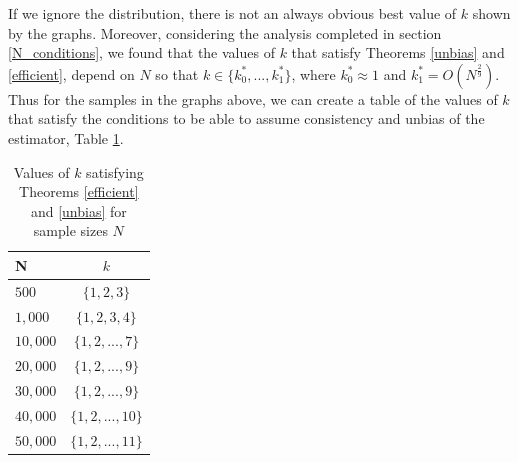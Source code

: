 \documentclass[12pt]{report}
\begin{document}
If we ignore the distribution, there is not an always obvious best value of $k$ shown by the graphs. Moreover, considering the analysis completed in section \ref{N_conditions}, we found that the values of $k$ that satisfy Theorems \ref{unbias} and \ref{efficient}, depend on $N$ so that $k \in \{k_{0}^{*}, ..., k_{1}^{*}\}$, where $k_{0}^{*} \approx 1$ and $k_{1}^{*} = O(N^{\frac{2}{9}})$. Thus for the samples in the graphs above, we can create a table of the values of $k$ that satisfy the conditions to be able to assume consistency and unbias of the estimator, Table \ref{ConditionK}.

\begin{table}
\caption{Values of $k$ satisfying Theorems \ref{efficient} and \ref{unbias} for sample sizes $N$} \label{ConditionK}
\begin{center}
\begin{tabular}{| l | c |} 
\toprule
N &  $k$ \\
\midrule[1pt]
$500$ & $\{1, 2, 3\}$ \\
$1,000$ & $\{1,2, 3, 4 \}$ \\
$10,000$ & $\{1, 2, ..., 7\}$ \\
$20,000$ & $\{1, 2, ..., 9\}$ \\
$30,000$ & $\{1,2, ..., 9 \}$ \\
$40,000$ & $\{1, 2, ...,10 \}$ \\
$50,000$ & $\{1, 2,  ..., 11\}$ \\
\hline
\end{tabular}
\\[10pt]
\end{center}
\end{table}
\end{document}
